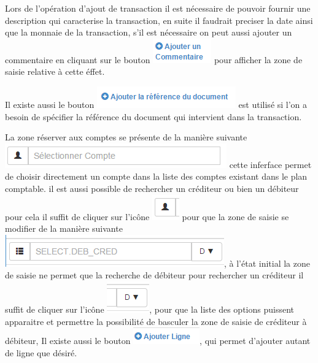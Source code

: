 \documentclass[12pt,a4paper]{report}
\begin{document}
Lors de l'opération d'ajout de transaction il est nécessaire de pouvoir fournir une description qui caracterise la transaction, en suite il faudrait preciser la date ainsi que la monnaie de la transaction, s'il est nécessaire on peut aussi ajouter un commentaire en cliquant sur le bouton \includegraphics[scale=0.7]{pic/AddComment.png} pour afficher la zone de saisie relative à cette éffet.

Il existe aussi le bouton \includegraphics[scale=0.7]{pic/AddRefDoc.png} est utilisé si l'on a besoin de spécifier la référence du document qui intervient dans la transaction. 

La zone réserver aux comptes se présente de la manière suivante
\\
\includegraphics[scale=0.7]{pic/SelectCompte.png} cette inferface permet de choisir directement un compte dans la liste des comptes existant dans le plan comptable. il est aussi possible de rechercher un créditeur ou bien un débiteur pour cela il suffit de cliquer sur l'icône \includegraphics[scale=0.7]{pic/SelectCompteIcone.png} pour que la zone de saisie se modifier de la manière suivante \includegraphics[scale=0.7]{pic/SelectDebCred.png}, à l'état initial la zone de saisie ne permet que la recherche de débiteur pour rechercher un créditeur il suffit de cliquer sur l'icône \includegraphics[scale=0.7]{pic/DebToCred.png}, pour que la liste des options puissent apparaitre et permettre la possibilité de basculer la zone de saisie de créditeur à débiteur, Il existe aussi le bouton \includegraphics[scale=0.7]{pic/AjouterLigne.png}, qui permet d'ajouter autant de ligne que désiré.
\end{document}

